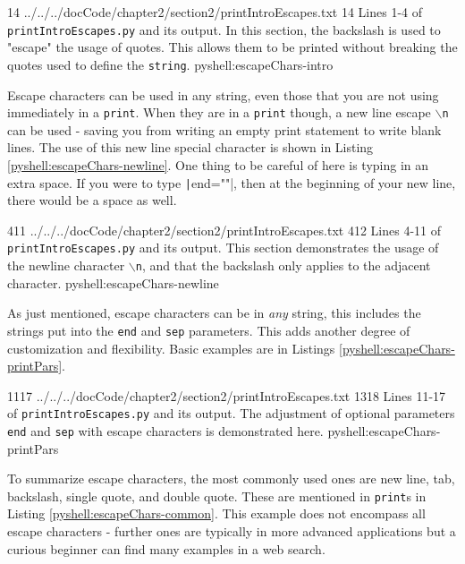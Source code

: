 \documentclass[oneside]{book}
\begin{document}
{1}{4}
{../../../docCode/chapter2/section2/printIntroEscapes.txt}
{1}{4}
{Lines 1-4 of \texttt{printIntroEscapes.py} and its output. In this section, the backslash is used to "escape" the usage of quotes. This allows them to be printed without breaking the quotes used to define the \texttt{string}.}
{pyshell:escapeChars-intro}

Escape characters can be used in any string, even those that you are not using immediately in a \texttt{print}. When they are in a \texttt{print} though, a new line escape \texttt{$\backslash$n} can be used - saving you from writing an empty print statement to write blank lines. The use of this new line special character is shown in Listing \ref{pyshell:escapeChars-newline}. One thing to be careful of here is typing in an extra space. If you were to type \texttt|end="\n "|, then at the beginning of your new line, there would be a space as well.
    
{4}{11}
{../../../docCode/chapter2/section2/printIntroEscapes.txt}
{4}{12}
{Lines 4-11 of \texttt{printIntroEscapes.py} and its output. This section demonstrates the usage of the newline character \texttt{$\backslash$n}, and that the backslash only applies to the adjacent character.}
{pyshell:escapeChars-newline}

As just mentioned, escape characters can be in \emph{any} string, this includes the strings put into the \texttt{end} and \texttt{sep} parameters. This adds another degree of customization and flexibility. Basic examples are in Listings \ref{pyshell:escapeChars-printPars}.
    
{11}{17}
{../../../docCode/chapter2/section2/printIntroEscapes.txt}
{13}{18}
{Lines 11-17 of \texttt{printIntroEscapes.py} and its output. The adjustment of optional parameters \texttt{end} and \texttt{sep} with escape characters is demonstrated here.}
{pyshell:escapeChars-printPars}

To summarize escape characters, the most commonly used ones are new line, tab, backslash, single quote, and double quote. These are mentioned in \texttt{print}s in Listing \ref{pyshell:escapeChars-common}. This example does not encompass all escape characters - further ones are typically in more advanced applications but a curious beginner can find many examples in a web search.
    
\end{document}
